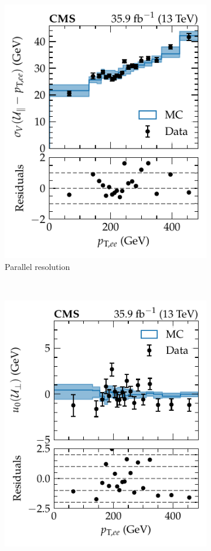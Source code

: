 \begin{figure}[htb]
\begin{subfigure}[b]{0.49\textwidth}
        \includegraphics{chapters/041_corrections/images/ptmiss_calib/metres_ee_sigmav_para.pdf}
        \caption{Parallel resolution}
        \label{subfigb:recoil-calib-ptllbins-ee}
    \end{subfigure}
    \\
    \begin{subfigure}[b]{0.49\textwidth}
        \centering
        \includegraphics{chapters/041_corrections/images/ptmiss_calib/metres_ee_u0_perp.pdf}

\end{subfigure}
\end{figure}
